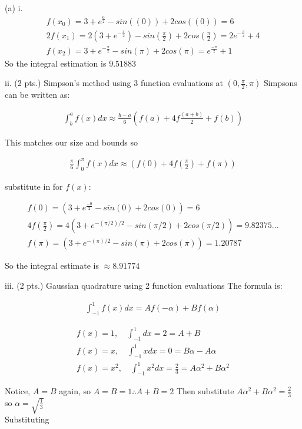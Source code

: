 \documentclass{article}
\begin{document}
\noindent
(a)
i.
\begin{gather*}
  f(x_{0})= 3 + e^{\frac{0}{2}} - sin((0)) + 2cos((0)) = 6\\
  2f(x_{1}) = 2(3 + e^{-\frac{\pi}{2}}) - sin(\frac{\pi}{2}) + 2cos(\frac{\pi}{2})  = 2e^{-\frac{\pi}{4}} + 4\\
  f(x_{2}) = 3 + e^{-\frac{\pi}{2}} - sin(\pi) + 2cos(\pi) = e^{\frac{-\pi}{2}} + 1
\end{gather*}
So the integral estimation is $9.51883$

ii. (2 pts.) Simpson’s method using 3 function evaluations at $(0,\frac{\pi}{2},\pi)$ Simpsons can be written
as:

\begin{gather*}
  \int_{b}^{a}f(x)dx \approx \frac{b-a}{6}\left(       f(a) + 4f\frac{(a+b)}{2}  + f(b)\right)
\end{gather*}

This matches our size and bounds so

\begin{gather*}
  \frac{\pi}{6}\int_{0}^{\pi}f(x)dx \approx (f(0) + 4f(\frac{\pi}{2}) +  f(\pi))
\end{gather*}

substitute in for $f(x)$:

\begin{gather*}
f(0) = (3 + e^{\frac{-0}{2}} - sin(0) + 2cos(0)) = 6 \\
4f(\frac{\pi}{2}) = 4(3 + e^{-(\pi/2)/2} - sin(\pi/2) + 2cos(\pi/2)) = 9.82375... \\
f(\pi) = (3 + e^{-(\pi)/2} - sin(\pi) + 2cos(\pi)) = 1.20787
\end{gather*}

So the integral estimate is $ \approx 8.91774$


iii. (2 pts.) Gaussian quadrature using 2 function evaluations The formula is:

\begin{gather*}
  \int_{-1}^{1}f(x)dx = Af(-\alpha) + Bf(\alpha)
\end{gather*}

\begin{gather*}
  f(x) = 1, \quad \int_{-1}^{1}dx = 2 = A+B\\
  f(x) = x, \quad \int_{-1}^{1}xdx = 0 = B\alpha - A\alpha\\
  f(x) = x^{2}, \quad \int_{-1}^{1} x^{2}dx = \frac{2}{3} = A\alpha^{2} + B\alpha^{2}
\end{gather*}

\noindent
Notice, $A = B$ again, so $A = B = 1 \therefore A+B = 2$
Then substitute $A\alpha^{2}  + B\alpha^{2} = \frac{2}{3}$ so $
\alpha = \sqrt{\frac{1}{3}}$ \\
Substituting
\end{document}

